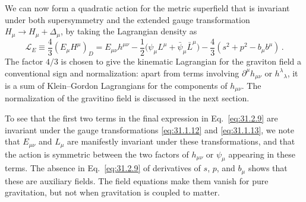 We can now form a quadratic action for the metric superfield that is invariant
under both supersymmetry and the extended gauge transformation
\(H_\mu\to H_\mu+\Delta_\mu\), by taking the Lagrangian density as
\begin{equation}
  \mathcal L_E
  \equiv\frac43(E_\mu H^\mu)_D
  =E_{\mu\nu}h^{\mu\nu}
   -\frac12\bigl(\psi_\mu L^\mu
                 +\bar\psi_\mu\bar L^\mu\bigr)
   -\frac43(s^2+p^2-b_\mu b^\mu)\,.
  \tag{31.2.9}\label{eq:31.2.9}
\end{equation}
The factor \(4/3\) is chosen to give the kinematic Lagrangian for the graviton
field a conventional sign and normalization: apart from terms involving
\(\partial^\mu h_{\mu\nu}\) or \(h^\lambda{}_\lambda\), it is a sum of
Klein--Gordon Lagrangians for the components of \(h_{\mu\nu}\). The
normalization of the gravitino field is discussed in the next section.

To see that the first two terms in the final expression in
Eq.~\eqref{eq:31.2.9} are invariant under the gauge transformations
\eqref{eq:31.1.12} and \eqref{eq:31.1.13}, we note that \(E_{\mu\nu}\) and
\(L_\mu\) are manifestly invariant under these transformations, and that the
action is symmetric between the two factors of \(h_{\mu\nu}\) or \(\psi_\mu\)
appearing in these terms. The absence in Eq.~\eqref{eq:31.2.9} of derivatives
of \(s\), \(p\), and \(b_\mu\) shows that these are auxiliary fields. The field
equations make them vanish for pure gravitation, but not when gravitation is
coupled to matter.

